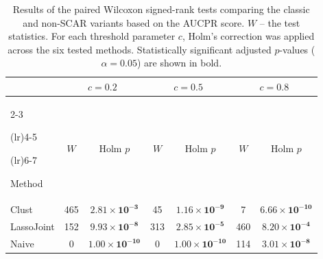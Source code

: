 \documentclass[11pt]{article}
\begin{document}
\begin{table}[H] 

\caption{Results of the paired Wilcoxon signed-rank tests comparing the classic and non-SCAR variants based on the AUCPR score. $W$ -- the test statistics. For each threshold parameter $c$, Holm's correction was applied across the six tested methods. Statistically significant adjusted $p$-values ($\alpha=0.05$) are shown in bold.} 

\label{tab:wilcoxon_aucpr} 

\centering 

\begin{tabular}{lccccc c} 

\toprule 

& \multicolumn{2}{c}{$c=0.2$} 

& \multicolumn{2}{c}{$c=0.5$} 

& \multicolumn{2}{c}{$c=0.8$} \\ 

\cmidrule(lr){2-3} 

\cmidrule(lr){4-5} 

\cmidrule(lr){6-7} 

Method 

& $W$ & Holm $p$ 

& $W$ & Holm $p$ 

& $W$ & Holm $p$ \\ 

\midrule 

Clust 

& 465 & $\mathbf{2.81\times10^{-3}}$ 

& 45  & $\mathbf{1.16\times10^{-9}}$ 

& 7   & $\mathbf{6.66\times10^{-10}}$ \\ 

 

LassoJoint 

& 152 & $\mathbf{9.93\times10^{-8}}$ 

& 313 & $\mathbf{2.85\times10^{-5}}$ 

& 460 & $\mathbf{8.20\times10^{-4}}$ \\ 

 

Naive 

& 0   & $\mathbf{1.00\times10^{-10}}$ 

& 0   & $\mathbf{1.00\times10^{-10}}$ 

& 114 & $\mathbf{3.01\times10^{-8}}$ \\ 

 


\end{tabular}
\end{table}
\end{document}
